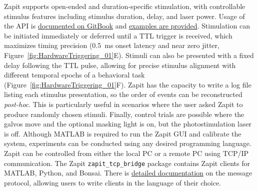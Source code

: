 \documentclass[9pt,lineno]{elife}
\begin{document}
Zapit supports open-ended and duration-specific stimulation, with controllable stimulus features including stimulus duration, delay, and laser power.
Usage of the API is \href{https://zapit.swcmicroscopy.com/running-experiments/matlab/running-an-experiment-in-matlab}{documented on GitBook} and \href{https://github.com/Zapit-Optostim/zapit/tree/main/examples}{examples are provided}.
Stimulation can be initiated immediately or deferred until a TTL trigger is received, which maximizes timing precision (0.5~ms onset latency and near zero jitter, Figure~\ref{fig:HardwareTriggering_01}E).
Stimuli can also be presented with a fixed delay following the TTL pulse, allowing for precise stimulus alignment with different temporal epochs of a behavioral task (Figure~\ref{fig:HardwareTriggering_01}F).
Zapit has the capacity to write a log file listing each stimulus presentation, so the order of events can be reconstructed \textit{post-hoc}.
This is particularly useful in scenarios where the user asked Zapit to produce randomly chosen stimuli.
Finally, control trials are possible where the galvos move and the optional masking light is on, but the photostimulation laser is off.
Although MATLAB is required to run the Zapit GUI and calibrate the system, experiments can be conducted using any desired programming language.
Zapit can be controlled from either the local PC or a remote PC using TCP/IP communication.
The Zapit \texttt{zapit\_tcp\_bridge} package contains Zapit clients for MATLAB, Python, and Bonsai.
There is \href{https://github.com/Zapit-Optostim/zapit-tcp-bridge/blob/main/Message_Protocol.md}{detailed documentation} on the message protocol, allowing users to write clients in the language of their choice.
\end{document}
